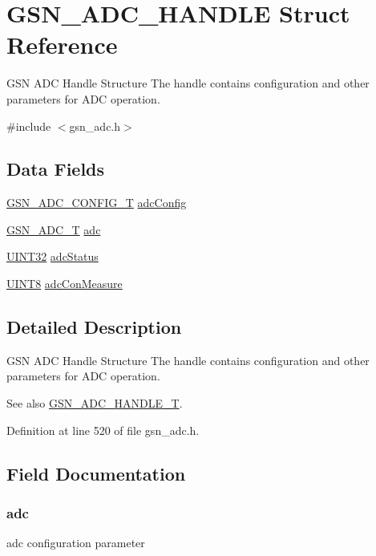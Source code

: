 \hypertarget{a00024}{
\section{GSN\_\-ADC\_\-HANDLE Struct Reference}
\label{a00024}
}


GSN ADC Handle Structure The handle contains configuration and other parameters for ADC operation.  




{\ttfamily \#include $<$gsn\_\-adc.h$>$}

\subsection*{Data Fields}
\begin{DoxyCompactItemize}
\item 
\hyperlink{a00023}{GSN\_\-ADC\_\-CONFIG\_\-T} \hyperlink{a00024_aaebeb2c1a57d5d7bd90cd85c581878f6}{adcConfig}
\item 
\hyperlink{a00022}{GSN\_\-ADC\_\-T} \hyperlink{a00024_ad0dc6fd73b15dc7bbcd3923c4af9bdec}{adc}
\item 
\hyperlink{a00660_gae1e6edbbc26d6fbc71a90190d0266018}{UINT32} \hyperlink{a00024_ae7ae66ca06858390a0505501b8a4b42d}{adcStatus}
\item 
\hyperlink{a00660_gab27e9918b538ce9d8ca692479b375b6a}{UINT8} \hyperlink{a00024_ae8569711f564a7efbdd255fd123cfd31}{adcConMeasure}
\end{DoxyCompactItemize}


\subsection{Detailed Description}
GSN ADC Handle Structure The handle contains configuration and other parameters for ADC operation. 

\begin{DoxySeeAlso}{See also}
\hyperlink{a00643_gac0da2e000e8dd65d554e2edf7cca8330}{GSN\_\-ADC\_\-HANDLE\_\-T}. 
\end{DoxySeeAlso}


Definition at line 520 of file gsn\_\-adc.h.



\subsection{Field Documentation}
\hypertarget{a00024_ad0dc6fd73b15dc7bbcd3923c4af9bdec}{
\subsubsection[{adc}]{ {\bf adc}}}
\label{a00024_ad0dc6fd73b15dc7bbcd3923c4af9bdec}
adc configuration parameter 

